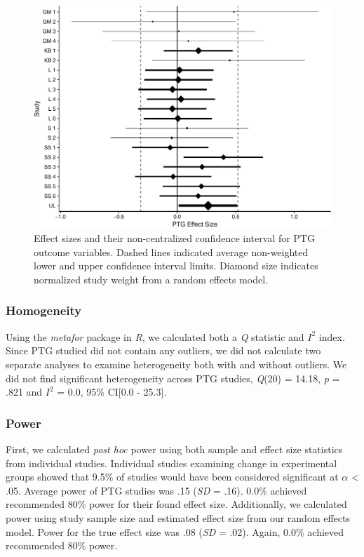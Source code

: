 \documentclass[man, mask]{apa6}
\theoremstyle{definition}
\theoremstyle{definition}
\theoremstyle{definition}
\theoremstyle{remark}
\begin{document}
\begin{figure}[htbp]
\centering
\includegraphics{meta_markdown_files/figure-latex/ptgpic-1.pdf}
\caption{\label{fig:ptgpic}Effect sizes and their non-centralized confidence
interval for PTG outcome variables. Dashed lines indicated average
non-weighted lower and upper confidence interval limits. Diamond size
indicates normalized study weight from a random effects model.}
\end{figure}

\subsubsection{Homogeneity}\label{homogeneity-1}

Using the \emph{metafor} package in \emph{R}, we calculated both a
\emph{Q} statistic and \(I^2\) index. Since PTG studied did not contain
any outliers, we did not calculate two separate analyses to examine
heterogeneity both with and without outliers. We did not find
significant heterogeneity across PTG studies, \emph{Q}(20) = 14.18,
\emph{p} = .821 and \(I^2\) = 0.0, 95\% CI{[}0.0 - 25.3{]}.

\subsubsection{Power}\label{power-1}

First, we calculated \emph{post hoc} power using both sample and effect
size statistics from individual studies. Individual studies examining
change in experimental groups showed that 9.5\% of studies would have
been considered significant at \(\alpha\) \textless{} .05. Average power
of PTG studies was .15 (\emph{SD} = .16). 0.0\% achieved recommended
80\% power for their found effect size. Additionally, we calculated
power using study sample size and estimated effect size from our random
effects model. Power for the true effect size was .08 (\emph{SD} = .02).
Again, 0.0\% achieved recommended 80\% power.
\end{document}
